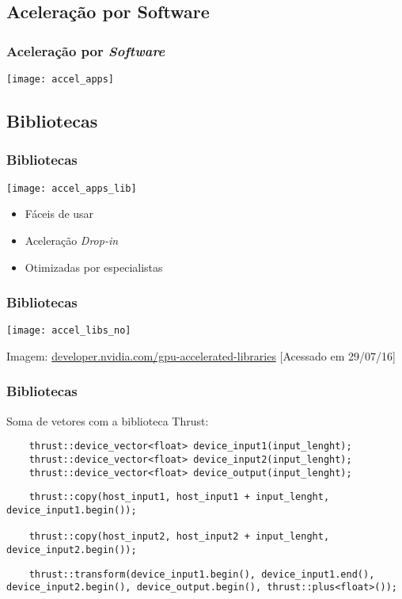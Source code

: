 \documentclass[10pt, compress]{beamer}
\begin{document}
\subsection{Aceleração por Software}

\begin{frame}
    \frametitle{Aceleração por \textit{Software}}
    \centering
    \texttt{[image: accel\_apps]}
\end{frame}

\subsection{Bibliotecas}

\begin{frame}
    \frametitle{Bibliotecas}
    \begin{center}
        \texttt{[image: accel\_apps\_lib]}
    \end{center}

    \begin{itemize}
        \item Fáceis de usar
        \item Aceleração \textit{Drop-in}
        \item Otimizadas por especialistas
    \end{itemize}
\end{frame}

\begin{frame}
    \frametitle{Bibliotecas}
    \centering
    \texttt{[image: accel\_libs\_no]}
    \vfill

    \tiny{Imagem: \url{developer.nvidia.com/gpu-accelerated-libraries} [Acessado em 29/07/16]}
\end{frame}

\begin{frame}[fragile]
    \frametitle{Bibliotecas}
    Soma de vetores com a biblioteca \alert{Thrust}:
    \begin{lstlisting}
    thrust::device_vector<float> device_input1(input_lenght);
    thrust::device_vector<float> device_input2(input_lenght);
    thrust::device_vector<float> device_output(input_lenght);
    \end{lstlisting}
    \pause
    \begin{lstlisting}
    thrust::copy(host_input1, host_input1 + input_lenght, device_input1.begin());

    thrust::copy(host_input2, host_input2 + input_lenght, device_input2.begin());
    \end{lstlisting}
    \pause
    \begin{lstlisting}
    thrust::transform(device_input1.begin(), device_input1.end(), device_input2.begin(), device_output.begin(), thrust::plus<float>());
    \end{lstlisting}
\end{frame}
\end{document}
